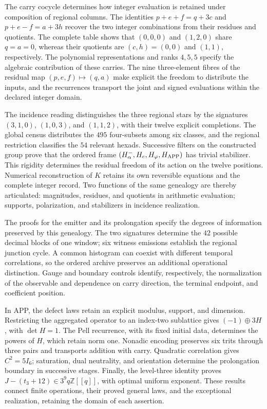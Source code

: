 The carry cocycle determines how integer evaluation is retained
under composition of regional columns. The identities
\(p+e+f=q+3c\) and \(p+e-f=a+3h\) recover the two integer
combinations from their residues and quotients. The complete table
shows that \((0,0,0)\) and \((1,2,0)\) share \(q=a=0\), whereas
their quotients are \((c,h)=(0,0)\) and \((1,1)\), respectively.
The polynomial representations and ranks \(4,5,5\) specify the
algebraic contribution of these carries. The nine three-element
fibres of the residual map \((p,e,f)\mapsto(q,a)\) make explicit
the freedom to distribute the inputs, and the recurrences transport
the joint and signed evaluations within the declared integer domain.

The incidence reading distinguishes the three regional stars by
the signatures \((3,1,0)\), \((1,0,3)\), and \((1,1,2)\), with
their twelve explicit completions. The global census distributes
the \(495\) four-subsets among six classes, and the regional
restriction classifies the \(54\) relevant hexads. Successive
filters on the constructed group prove that the ordered frame
\((H^-_\alpha,H_e,H_\varphi,H_{\rm APP})\) has trivial stabilizer.
This rigidity determines the residual freedom of its action on
the twelve positions. Numerical reconstruction of \(K\) retains
its own reversible equations and the complete integer record.
Two functions of the same genealogy are thereby articulated:
magnitudes, residues, and quotients in arithmetic evaluation;
supports, polarization, and stabilizers in incidence realization.


The proofs for the emitter and its prolongation specify the degrees of
information preserved by this genealogy. The two signatures determine the
\(42\) possible decimal blocks of one window; six witness emissions
establish the regional junction cycle. A common histogram can coexist
with different temporal correlations, so the ordered archive preserves
an additional operational distinction. Gauge and boundary controls
identify, respectively, the normalization of the observable and dependence
on carry direction, the terminal endpoint, and coefficient position.

In APP, the defect laws retain an explicit modulus, support, and dimension.
Restricting the aggregated operator to an index-two sublattice gives
\((-1)\oplus3H\), with \(\det H=1\). The Pell recurrence, with its
fixed initial data, determines the powers of \(H\), which retain norm
one. Nonadic encoding preserves six trits through three pairs
and transports addition with carry. Quadratic correlation gives
\(C^2=5I_6\); saturation, dual neutrality, and orientation determine
the prolongation boundary in successive stages. Finally, the level-three
identity proves \(J-(t_3+12)\in3^9q\mathbb Z[[q]]\), with optimal
uniform exponent. These results connect finite operations, their proved
general laws, and the exceptional realization, retaining the domain
of each assertion.

